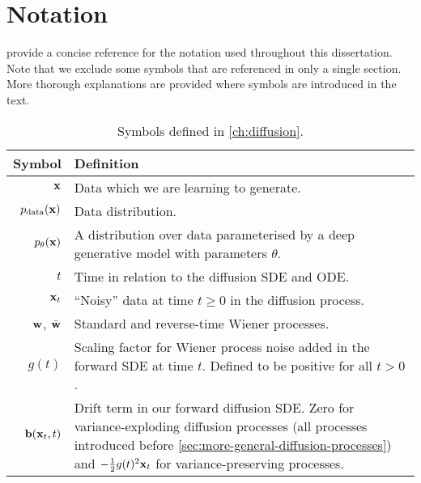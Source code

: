 \chapter{Notation}

 provide a concise reference for the notation used throughout this dissertation. Note that we exclude some symbols that are referenced in only a single section. More thorough explanations are provided where symbols are introduced in the text.

\begin{table*}
  \caption{Symbols defined in \cref{ch:diffusion}. 
  }
  \label{tab:diffusion-notation-appendix}
  \centering
  \footnotesize
  \begin{tabular}{rp{9cm}}
    \toprule
    Symbol    & Definition   \\
    \midrule
    ${\mathbf{x}}$                                  & Data which we are learning to generate. \\ %
    $p_{\rm{data}}({\mathbf{x}})$                          & Data distribution. \\
    $p_\theta({\mathbf{x}})$                        & A distribution over data parameterised by a deep generative model with parameters $\theta$. \\
    $t$                                     & Time in relation to the diffusion SDE and ODE.  \\
    ${\mathbf{x}}_t$                                & ``Noisy'' data at time $t \geq 0$ in the diffusion process.  \\
    ${\mathbf{w}}$, $\bar{{\mathbf{w}}}$                    & Standard and reverse-time Wiener processes. \\
    $g(t)$                                  & Scaling factor for Wiener process noise added in the forward SDE at time $t$. Defined to be positive for all $t > 0$. \\
    ${\mathbf{b}}({\mathbf{x}}_t, t)$                       & Drift term in our forward diffusion SDE. Zero for variance-exploding diffusion processes (all processes introduced before \cref{sec:more-general-diffusion-processes}) and $-\frac{1}{2}g(t)^2 {\mathbf{x}}_t$ for variance-preserving processes. \\

\end{tabular}
\end{table*}
